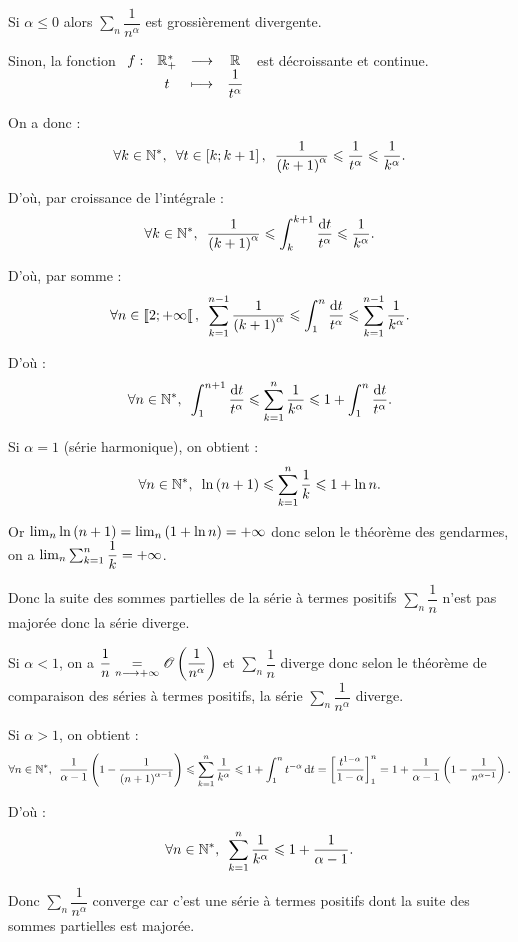 \begin{dem}~\\
Si \(\alpha\leq0\) alors \(\sum_n\dfrac{1}{n^\alpha}\) est grossièrement divergente.

Sinon, la fonction \(\begin{array}[t]{cccc}f : & \mathbb{R}_+^* & \longrightarrow & \mathbb{R} \\ & t & \longmapsto & \dfrac{1}{t^\alpha}\end{array}\) est décroissante et continue.

On a donc : \[\quantifs{\forall k\in\Ns;\forall t\in\intervii{k}{k+1}}\dfrac{1}{\paren{k+1}^\alpha}\leq\dfrac{1}{t^\alpha}\leq\dfrac{1}{k^\alpha}.\]

D'où, par croissance de l'intégrale : \[\quantifs{\forall k\in\Ns}\dfrac{1}{\paren{k+1}^\alpha}\leq\int_k^{k+1}\dfrac{\odif{t}}{t^\alpha}\leq\dfrac{1}{k^\alpha}.\]

D'où, par somme : \[\quantifs{\forall n\in\interventierie{2}{\pinf}}\sum_{k=1}^{n-1}\dfrac{1}{\paren{k+1}^\alpha}\leq\int_1^n\dfrac{\odif{t}}{t^\alpha}\leq\sum_{k=1}^{n-1}\dfrac{1}{k^\alpha}.\]

D'où : \[\quantifs{\forall n\in\Ns}\int_1^{n+1}\dfrac{\odif{t}}{t^\alpha}\leq\sum_{k=1}^n\dfrac{1}{k^\alpha}\leq1+\int_1^n\dfrac{\odif{t}}{t^\alpha}.\]

Si \(\alpha=1\) (série harmonique), on obtient : \[\quantifs{\forall n\in\Ns}\ln\paren{n+1}\leq\sum_{k=1}^n\dfrac{1}{k}\leq1+\ln n.\]

Or \(\lim_n\ln\left(n+1\right)=\lim_n\left(1+\ln n\right)=+\infty\) donc selon le théorème des gendarmes, on a \(\lim_n\sum_{k=1}^n\dfrac{1}{k}=+\infty\).

Donc la suite des sommes partielles de la série à termes positifs \(\sum_n\dfrac{1}{n}\) n'est pas majorée donc la série diverge.

Si \(\alpha<1\), on a \(\dfrac{1}{n}\underset{n\longrightarrow+\infty}{=}\mathscr{O}\left(\dfrac{1}{n^\alpha}\right)\) et \(\sum_n\dfrac{1}{n}\) diverge donc selon le théorème de comparaison des séries à termes positifs, la série \(\sum_n\dfrac{1}{n^\alpha}\) diverge.

Si \(\alpha>1\), on obtient : \[\quantifs{\forall n\in\Ns}\dfrac{1}{\alpha-1}\paren{1-\dfrac{1}{\paren{n+1}^{\alpha-1}}}\leq\sum_{k=1}^n\dfrac{1}{k^\alpha}\leq1+\int_1^nt^{-\alpha}\odif{t}=\croch{\dfrac{t^{1-\alpha}}{1-\alpha}}_1^n=1+\dfrac{1}{\alpha-1}\paren{1-\dfrac{1}{n^{\alpha-1}}}.\]

D'où : \[\quantifs{\forall n\in\Ns}\sum_{k=1}^n\dfrac{1}{k^\alpha}\leq1+\dfrac{1}{\alpha-1}.\]

Donc \(\sum_n\dfrac{1}{n^\alpha}\) converge car c'est une série à termes positifs dont la suite des sommes partielles est majorée.
\end{dem}

